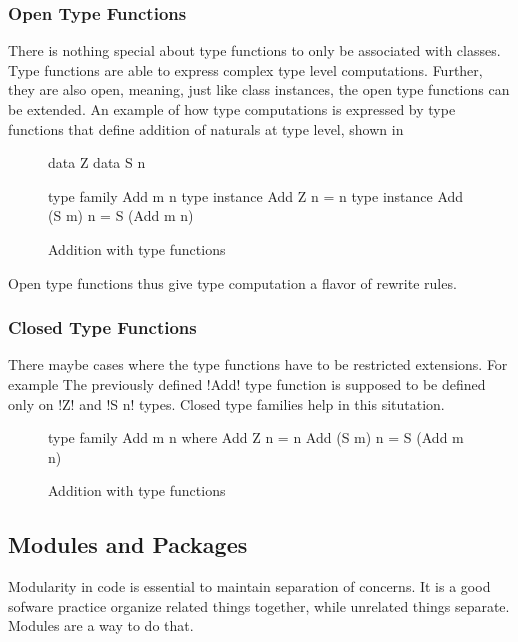 \documentclass[manuscript,screen,nonacm]{acmart}
\begin{document}
\subsubsection{Open Type Functions}
There is nothing special about type functions to only be associated with classes. Type functions are able to express complex type level computations. Further, they are also open, meaning, just like class instances, the open type functions can be extended. An example of how type computations is expressed by type functions that define addition of naturals at type level, shown in 
\begin{figure}[ht]
  \begin{minipage}[ht]{0.4\linewidth}
    \begin{code}
      data Z
      data S n
    \end{code}
  \end{minipage}%
  \begin{minipage}[ht]{0.4\linewidth}
    \begin{code}
      type family Add m n
      type instance Add Z n = n
      type instance Add (S m) n = S (Add m n)
    \end{code}
  \end{minipage}
  \caption{Addition with type functions}
  \label{fig:open-type-fun-add}
\end{figure}
Open type functions thus give type computation a flavor of rewrite rules.
\subsubsection{Closed Type Functions}
There maybe cases where the type functions have to be restricted extensions. For example The previously defined
!Add! type function is supposed to be defined only on !Z! and !S n! types. Closed type families help in this situtation. 
\begin{figure}[ht]
  \begin{minipage}[ht]{0.4\linewidth}
    \begin{code}
      type family Add m n where
          Add Z n = n
          Add (S m) n = S (Add m n)
    \end{code}
  \end{minipage}
  \caption{Addition with type functions}
  \label{fig:closed-type-fun-add}
\end{figure}

\subsection{Modules and Packages}
Modularity in code is essential to maintain separation of concerns. It is a good sofware practice organize related things together, while unrelated things separate. Modules are a way to do that. 
\end{document}
